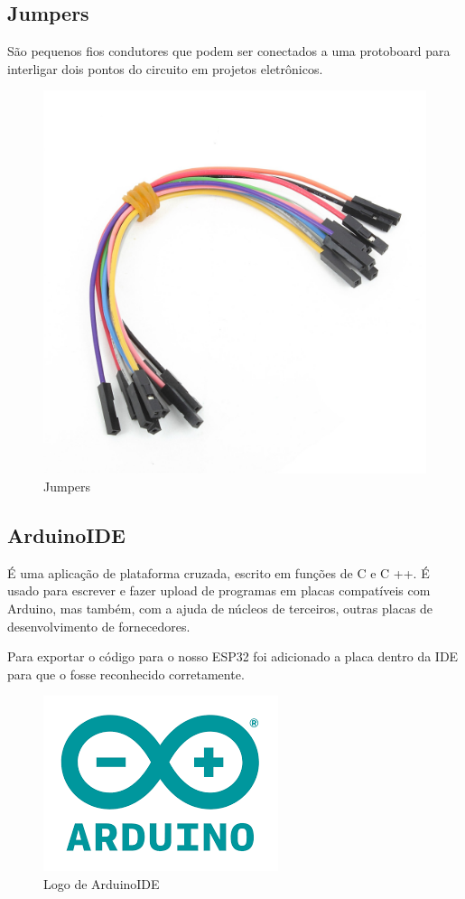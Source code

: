 \documentclass[12pt]{article}
\begin{document}
\subsection{Jumpers}
São pequenos fios condutores que podem ser conectados a uma protoboard
para interligar dois pontos do circuito em projetos eletrônicos.

\begin{figure}[ht]
  \centering
  \includegraphics[width=.45\textwidth]{Images/jumpers.jpg}
  \caption{Jumpers}
  \label{fig:exampleJumpers}
\end{figure}
\subsection{ArduinoIDE}
É uma aplicação de plataforma cruzada, escrito em funções de C e C ++. É usado para escrever e fazer upload de
programas em placas compatíveis com Arduino, mas também, com a ajuda de núcleos de terceiros, outras placas de
desenvolvimento de fornecedores.

Para exportar o código para o nosso ESP32 foi adicionado a placa dentro da IDE para que o fosse reconhecido corretamente.

\begin{figure}[ht]
  \centering
  \includegraphics[width=.45\textwidth]{Images/arduinoIDELogo.png}
  \caption{Logo de ArduinoIDE}
  \label{fig:exampleArduinoIDE}
\end{figure}
\end{document}
